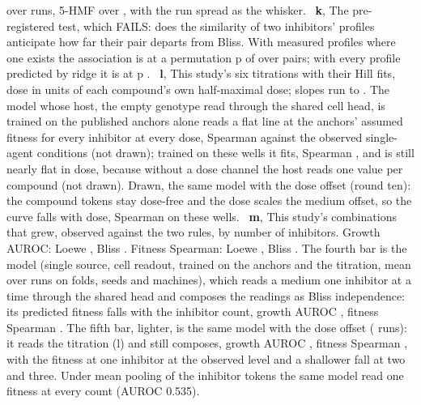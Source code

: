 \hydprofFfCgt{} over \hydprofFfCgtRuns{} runs, 5-HMF \hydprofHmfCgt{} over
\hydprofHmfCgtRuns{}, with the run spread as the whisker. \,
\textbf{k}, The pre-registered test, which FAILS: does the similarity of two
inhibitors' profiles anticipate how far their pair departs from Bliss. With measured
profiles where one exists the association is \hydsvdBestSpearman{} at a permutation p
of \hydsvdBestP{} over \hydsvdBestPairs{} pairs; with every profile predicted by ridge
it is \hydsvdPredSpearman{} at p \hydsvdPredP{}. \,
\textbf{l}, This study's six titrations with their Hill fits, dose in units of each
compound's own half-maximal dose; slopes run \hydhillMin{} to \hydhillMax{}. The model
whose host, the empty genotype read through the shared cell head, is trained on the
published anchors alone reads a flat line at the anchors' assumed fitness for every
inhibitor at every dose, Spearman \hydexTwoOneZeroShotSpearman{} against the
\hydexTwoOneZeroShotConditions{} observed single-agent conditions (not drawn); trained
on these wells it fits, Spearman \hydexTwoOneFittedSpearman{}, and is still nearly flat
in dose, because without a dose channel the host reads one value per compound (not
drawn). Drawn, the same model with the dose offset (round ten): the compound tokens
stay dose-free and the dose scales the medium offset, so the curve falls with dose,
Spearman \hydexTwoOneDoseSpearman{} on these wells. \,
\textbf{m}, This study's combinations that grew, observed against the two rules, by
number of inhibitors. Growth AUROC: Loewe \hydloeweAuroc{}, Bliss \hydblissAuroc{}.
Fitness Spearman: Loewe \hydloeweSpearman{}, Bliss \hydblissSpearman{}. The fourth bar
is the model (single source, cell readout, trained on the anchors and the titration,
mean over \hydmodelRuns{} runs on \hydmodelFolds{} folds, seeds and machines), which
reads a medium one inhibitor at a time through the shared head and composes the
readings as Bliss independence: its predicted fitness falls with the inhibitor count,
growth AUROC \hydmodelAuroc{}, fitness Spearman \hydmodelGrownSpearman{}. The fifth bar,
lighter, is the same model with the dose offset (\hydmodelDoseRuns{} runs): it reads
the titration (l) and still composes, growth AUROC \hydmodelDoseAuroc{}, fitness
Spearman \hydmodelDoseGrownSpearman{}, with the fitness at one inhibitor at the observed
level and a shallower fall at two and three. Under mean pooling of the inhibitor tokens
the same model read one fitness at every count (AUROC 0.535).
\,
